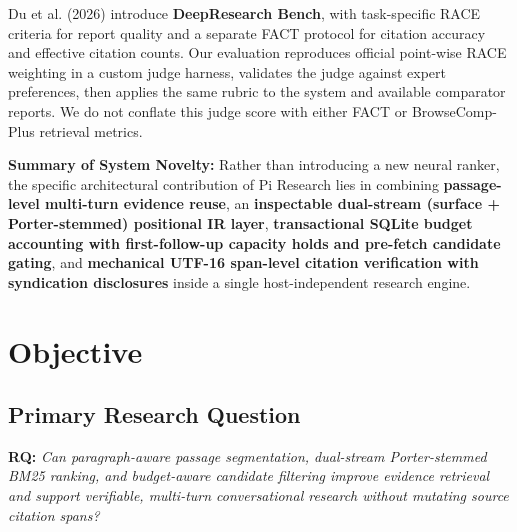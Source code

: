\documentclass[conference]{IEEEtran}
\begin{document}
Du et al. (2026) introduce \textbf{DeepResearch Bench}, with task-specific RACE criteria for report quality and a separate FACT protocol for citation accuracy and effective citation counts. Our evaluation reproduces official point-wise RACE weighting in a custom judge harness, validates the judge against expert preferences, then applies the same rubric to the system and available comparator reports. We do not conflate this judge score with either FACT or BrowseComp-Plus retrieval metrics.

\textbf{Summary of System Novelty:} Rather than introducing a new neural ranker, the specific architectural contribution of Pi Research lies in combining \textbf{passage-level multi-turn evidence reuse}, an \textbf{inspectable dual-stream (surface + Porter-stemmed) positional IR layer}, \textbf{transactional SQLite budget accounting with first-follow-up capacity holds and pre-fetch candidate gating}, and \textbf{mechanical UTF-16 span-level citation verification with syndication disclosures} inside a single host-independent research engine.

\section{Objective}

\subsection{Primary Research Question}
\textbf{RQ:} \textit{Can paragraph-aware passage segmentation, dual-stream Porter-stemmed BM25 ranking, and budget-aware candidate filtering improve evidence retrieval and support verifiable, multi-turn conversational research without mutating source citation spans?}
\end{document}
